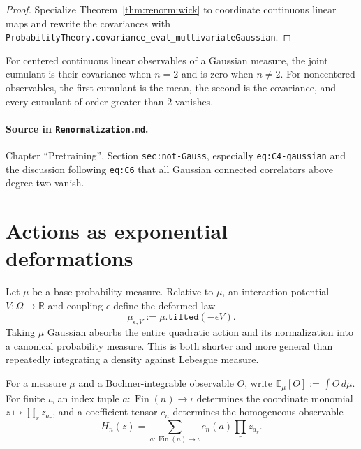 \begin{proof}
Specialize Theorem~\ref{thm:renorm:wick} to coordinate continuous linear maps and rewrite the
covariances with \texttt{ProbabilityTheory.covariance\_eval\_multivariateGaussian}.
\end{proof}

\begin{corollary}
\label{cor:renorm:gaussianCumulant}
For centered continuous linear observables of a Gaussian measure, the joint cumulant is their
covariance when $n=2$ and is zero when $n\neq2$.  For noncentered observables, the first cumulant is
the mean, the second is the covariance, and every cumulant of order greater than $2$ vanishes.

\paragraph{Source in \texttt{Renormalization.md}.}
Chapter ``Pretraining'', Section \texttt{sec:not-Gauss}, especially \texttt{eq:C4-gaussian} and the
discussion following \texttt{eq:C6} that all Gaussian connected correlators above degree two
vanish.
\end{corollary}

\section{Actions as exponential deformations}

Let $\mu$ be a base probability measure.  Relative to $\mu$, an interaction potential
$V:\Omega\to\mathbb R$ and coupling $\epsilon$ define the deformed law
\[
  \mu_{\epsilon,V}:=\mu.\texttt{tilted}(-\epsilon V).
\]
Taking $\mu$ Gaussian absorbs the entire quadratic action and its normalization into a canonical
probability measure.  This is both shorter and more general than repeatedly integrating a density
against Lebesgue measure.

\begin{definition}
\label{def:renorm:expectation}
For a measure $\mu$ and a Bochner-integrable observable $O$, write
$\mathbb E_\mu[O]:=\int O\,d\mu$.  For finite $\iota$, an index tuple
$a:\operatorname{Fin}(n)\to\iota$ determines the coordinate monomial
$z\mapsto\prod_r z_{a_r}$, and a coefficient tensor $c_n$ determines the homogeneous observable
\[
 H_n(z)=\sum_{a:\operatorname{Fin}(n)\to\iota}c_n(a)\prod_r z_{a_r}.
\]
\end{definition}

